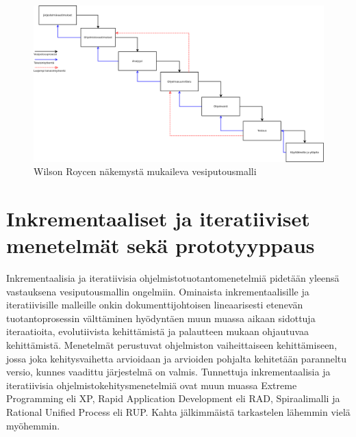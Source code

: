 \documentclass[finnish,12pt]{tktltiki2}
\theoremstyle{definition}
\theoremstyle{remark}
\begin{document}
\begin{figure}
\centering
{}
\includegraphics[width=240mm]{Diagram1.png}
\caption{Wilson Roycen näkemystä mukaileva vesiputousmalli}
\label{overflow}

\end{figure}
\clearpage

\section{Inkrementaaliset ja iteratiiviset menetelmät sekä prototyyppaus}

Inkrementaalisia ja iteratiivisia ohjelmistotuotantomenetelmiä pidetään yleensä vastauksena vesiputousmallin ongelmiin. Ominaista inkrementaalisille ja iteratiivisille malleille onkin dokumenttijohtoisen lineaarisesti etenevän tuotantoprosessin välttäminen hyödyntäen muun muassa aikaan sidottuja iteraatioita, evolutiivista kehittämistä ja palautteen mukaan ohjautuvaa kehittämistä. \cite{larman03} Menetelmät perustuvat ohjelmiston vaiheittaiseen kehittämiseen, jossa joka kehitysvaihetta arvioidaan ja arvioiden pohjalta kehitetään paranneltu versio, kunnes vaadittu järjestelmä on valmis. \cite{Sommerville10}
Tunnettuja inkrementaalisia ja iteratiivisia ohjelmistokehitysmenetelmiä ovat muun muassa Extreme Programming eli XP, Rapid Application Development eli RAD, Spiraalimalli ja Rational Unified Process eli RUP. Kahta jälkimmäistä tarkastelen lähemmin vielä myöhemmin.
\end{document}
